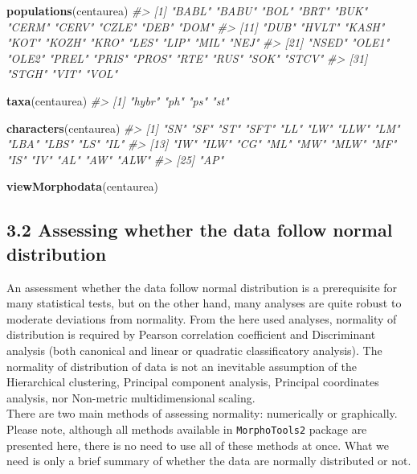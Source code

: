 \documentclass[
]{article}
\newenvironment{Shaded}{\begin{snugshade}}{\end{snugshade}}
\newcommand{\CommentTok}[1]{\textcolor[rgb]{0.56,0.35,0.01}{\textit{#1}}}
\newcommand{\KeywordTok}[1]{\textcolor[rgb]{0.13,0.29,0.53}{\textbf{#1}}}
\newcommand{\NormalTok}[1]{#1}
\begin{document}
\begin{Shaded}
\begin{Highlighting}[]
\KeywordTok{populations}\NormalTok{(centaurea)}
\CommentTok{#>  [1] "BABL" "BABU" "BOL"  "BRT"  "BUK"  "CERM" "CERV" "CZLE" "DEB"  "DOM" }
\CommentTok{#> [11] "DUB"  "HVLT" "KASH" "KOT"  "KOZH" "KRO"  "LES"  "LIP"  "MIL"  "NEJ" }
\CommentTok{#> [21] "NSED" "OLE1" "OLE2" "PREL" "PRIS" "PROS" "RTE"  "RUS"  "SOK"  "STCV"}
\CommentTok{#> [31] "STGH" "VIT"  "VOL"}
\end{Highlighting}
\end{Shaded}

\begin{Shaded}
\begin{Highlighting}[]
\KeywordTok{taxa}\NormalTok{(centaurea)}
\CommentTok{#> [1] "hybr" "ph"   "ps"   "st"}
\end{Highlighting}
\end{Shaded}

\begin{Shaded}
\begin{Highlighting}[]
\KeywordTok{characters}\NormalTok{(centaurea)}
\CommentTok{#>  [1] "SN"  "SF"  "ST"  "SFT" "LL"  "LW"  "LLW" "LM"  "LBA" "LBS" "LS"  "IL" }
\CommentTok{#> [13] "IW"  "ILW" "CG"  "ML"  "MW"  "MLW" "MF"  "IS"  "IV"  "AL"  "AW"  "ALW"}
\CommentTok{#> [25] "AP"}
\end{Highlighting}
\end{Shaded}

\begin{Shaded}
\begin{Highlighting}[]
\KeywordTok{viewMorphodata}\NormalTok{(centaurea)}
\end{Highlighting}
\end{Shaded}

\hypertarget{assessing-whether-the-data-follow-normal-distribution}{%
\subsection{3.2 Assessing whether the data follow normal
distribution}\label{assessing-whether-the-data-follow-normal-distribution}}

An assessment whether the data follow normal distribution is a
prerequisite for many statistical tests, but on the other hand, many
analyses are quite robust to moderate deviations from normality. From
the here used analyses, normality of distribution is required by Pearson
correlation coefficient and Discriminant analysis (both canonical and
linear or quadratic classificatory analysis). The normality of
distribution of data is not an inevitable assumption of the Hierarchical
clustering, Principal component analysis, Principal coordinates
analysis, nor Non-metric multidimensional scaling.\\
There are two main methods of assessing normality: numerically or
graphically. Please note, although all methods available in
\texttt{MorphoTools2} package are presented here, there is no need to
use all of these methods at once. What we need is only a brief summary
of whether the data are normally distributed or not.
\end{document}
